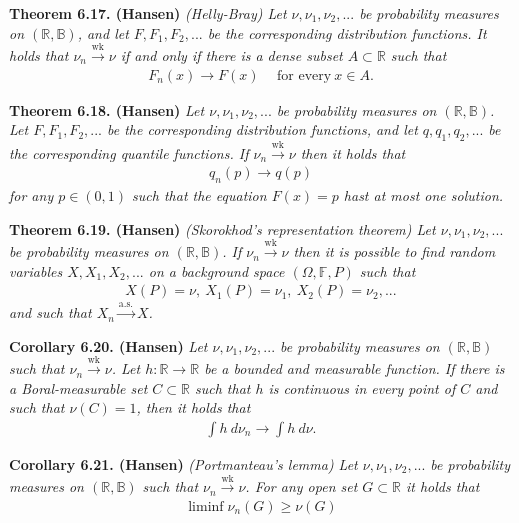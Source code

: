 \documentclass[a4paper,10pt,openany]{book}
\begin{document}
\textbf{Theorem 6.17. (Hansen)} \emph{(Helly-Bray) Let \(\nu,\nu_1,\nu_2,...\) be probability measures on \((\mathbb{R},\mathbb{B})\), and let \(F,F_1,F_2,...\) be the corresponding distribution functions. It holds that \(\nu_n\stackrel{\text{wk}}{\to}\nu\) if and only if there is a dense subset \(A\subset\mathbb{R}\) such that}
\begin{align*}
    F_n(x)\to F(x)\hspace{15pt}\text{for every}\ x\in A.\tag{6.16}
\end{align*}

\textbf{Theorem 6.18. (Hansen)} \emph{Let \(\nu,\nu_1,\nu_2,...\) be probability measures on \((\mathbb{R},\mathbb{B})\). Let \(F,F_1,F_2,...\) be the corresponding distribution functions, and let \(q,q_1,q_2,...\) be the corresponding quantile functions. If \(\nu_n\stackrel{\text{wk}}{\to}\nu\) then it holds that}
\begin{align*}
    q_n(p)\to q(p)
\end{align*}
\emph{for any \(p\in(0,1)\) such that the equation \(F(x)=p\) hast at most one solution.}

\textbf{Theorem 6.19. (Hansen)} \emph{(Skorokhod's representation theorem) Let \(\nu,\nu_1,\nu_2,...\) be probability measures on \((\mathbb{R},\mathbb{B})\). If \(\nu_n\stackrel{\text{wk}}{\to} \nu\) then it is possible to find random variables \(X,X_1,X_2,...\) on a background space \((\Omega,\mathbb{F},P)\) such that}
\begin{align*}
    X(P)=\nu,\ X_1(P)=\nu_1,\ X_2(P)=\nu_2, ...
\end{align*}
\emph{and such that \(X_n\stackrel{\text{a.s.}}{\to} X\).}

\textbf{Corollary 6.20. (Hansen)} \emph{Let \(\nu,\nu_1,\nu_2,...\) be probability measures on \((\mathbb{R},\mathbb{B})\) such that \(\nu_n\stackrel{\text{wk}}{\to}\nu\). Let \(h : \mathbb{R}\to\mathbb{R}\) be a bounded and measurable function. If there is a Boral-measurable set \(C\subset \mathbb{R}\) such that \(h\) is continuous in every point of \(C\) and such that \(\nu(C)=1\), then it holds that}
\begin{align*}
    \int h\ d\nu_n\to \int h\ d\nu.\tag{6.20}
\end{align*}

\textbf{Corollary 6.21. (Hansen)} \emph{(Portmanteau's lemma) Let \(\nu,\nu_1,\nu_2,...\) be probability measures on \((\mathbb{R},\mathbb{B})\) such that \(\nu_n\stackrel{\text{wk}}{\to}\nu\). For any open set \(G\subset \mathbb{R}\) it holds that}
\begin{align*}
    \liminf{\nu_n(G)}\ge \nu(G)\tag{6.21}
\end{align*}
\end{document}
